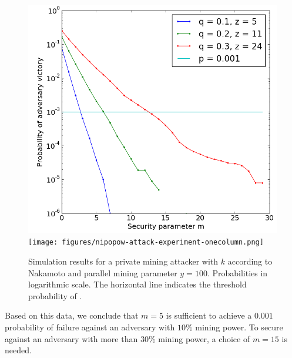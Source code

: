 \begin{figure}
    \caption{\label{fig.nipopow-attack-experiment}
        Simulation results for a private mining attacker with $k$ according to
        Nakamoto and parallel mining parameter $y = 100$. Probabilities in
        logarithmic scale. The horizontal line indicates the threshold
        probability of \cite{bitcoin}.
    }
    \centering
    \iftwocolumn
        \includegraphics[width=0.9 \columnwidth,keepaspectratio]{figures/nipopow-attack-experiment.png}
    \else
        \texttt{[image: figures/nipopow-attack-experiment-onecolumn.png]}
    \fi
\end{figure}

Based on this data, we conclude that $m = 5$ is sufficient to achieve a $0.001$
probability of failure against an adversary with $10\%$ mining power. To secure
against an adversary with more than $30\%$ mining power, a choice of $m = 15$ is
needed.
